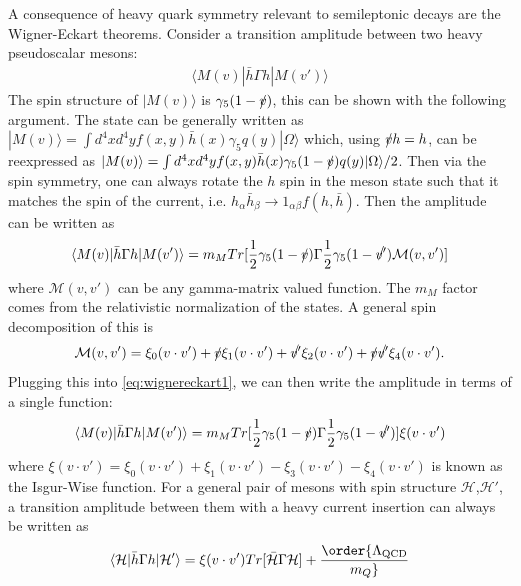 A consequence of heavy quark symmetry relevant to semileptonic decays are the Wigner-Eckart theorems. Consider a transition amplitude between two heavy pseudoscalar mesons:
\begin{align}
	\langle M(v) | \bar{h} \Gamma h | M(v') \rangle
\end{align}
The spin structure of $| M(v) \rangle$ is $\gamma_5 (1-\slashed{v})$, this can be shown with the following argument. The state can be generally written as $| M(v) \rangle = \int d^4x d^4y f(x,y) \bar{h}(x) \gamma_5 q(y) | \Omega \rangle$ which, using $\slashed{v} h = h$, can be reexpressed as $| M(v) \rangle = \int d^4x d^4y f(x,y) \bar{h}(x) \gamma_5 (1-\slashed{v}) q(y) | \Omega \rangle /2$. Then via the spin symmetry, one can always rotate the $h$ spin in the meson state such that it matches the spin of the current, i.e. $h_{\alpha} \bar{h}_{\beta} \to 1_{\alpha\beta} f(h,\bar{h})$. Then the amplitude can be written as
\begin{align}
	\langle M(v) | \bar{h} \Gamma h | M(v') \rangle = m_M Tr[ {1\over 2} \gamma_5 (1 - \slashed{v}) \Gamma {1\over 2} \gamma_5 (1 - \slashed{v'}) \mathcal{M}(v,v')]
	\label{eq:wignereckart1}
\end{align} 
where $\mathcal{M}(v,v')$ can be any gamma-matrix valued function. The $m_M$ factor comes from the relativistic normalization of the states. A general spin decomposition of this is
\begin{align}
	\mathcal{M}(v,v') = \xi_0(v\cdot v') + \slashed{v} \xi_1(v\cdot v') + \slashed{v'} \xi_2(v\cdot v') + \slashed{v}\slashed{v'} \xi_4(v\cdot v').
\end{align}
Plugging this into \eqref{eq:wignereckart1}, we can then write the amplitude in terms of a single function:
\begin{align}
\langle M(v) | \bar{h} \Gamma h | M(v') \rangle = m_M Tr[ {1\over 2} \gamma_5 (1 - \slashed{v}) \Gamma {1\over 2} \gamma_5 (1 - \slashed{v'}) ] \xi(v\cdot v')
\end{align}
where $\xi(v\cdot v') = \xi_0(v\cdot v') + \xi_1(v\cdot v') - \xi_3(v\cdot v') - \xi_4(v\cdot v')$ is known as the Isgur-Wise function. For a general pair of mesons with spin structure $\mathcal{H}$,$\mathcal{H}'$, a transition amplitude between them with a heavy current insertion can always be written as
\begin{align}
	\langle \mathcal{H} | \bar{h} \Gamma h | \mathcal{H}' \rangle = \xi(v\cdot v') Tr[ \bar{\mathcal{H}} \Gamma \mathcal{H} ] + \order{\Lambda_{\text{QCD}}\over m_Q}
\end{align}
